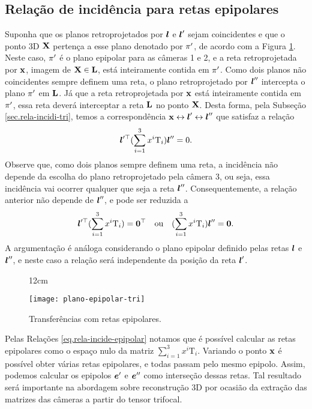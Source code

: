 \subsection{Relação de incidência para retas epipolares}\label{sec.rela-reta-epipolar-tri}
Suponha que os planos retroprojetados por $\boldsymbol{l}$ e $\boldsymbol{l}'$ sejam coincidentes e que o ponto 3D $\mathbf{X}$ pertença a esse plano denotado por $\pi'$, de acordo com a Figura \ref{fig.plano-epipolar-tri}. Neste caso, $\pi'$ é o plano epipolar para as câmeras 1 e 2, e a reta retroprojetada por $\mathbf{x}$, imagem de $\mathbf{X}\in{\bf L}$, está inteiramente contida em $\pi'$. Como dois planos não coincidentes sempre definem uma reta, o plano retroprojetado por $\boldsymbol{l}''$ intercepta o plano $\pi'$ em ${\bf L}$. Já que a reta retroprojetada por $\mathbf{x}$ está inteiramente contida em $\pi'$, essa reta deverá interceptar a reta ${\bf L}$ no ponto $\mathbf{X}$. Desta forma, pela Subseção \ref{sec.rela-incidi-tri}, temos a correspondência $\mathbf{x}\leftrightarrow\boldsymbol{l}'\leftrightarrow\boldsymbol{l}''$ que satisfaz a relação
\begin{equation*}
\boldsymbol{l}'^\top(\sum_{i=1}^3 x^i\mbox{T}_i)\boldsymbol{l}''=0.
\end{equation*}
Observe que, como dois planos sempre definem uma reta, a incidência não depende da escolha do plano retroprojetado pela câmera 3, ou seja, essa incidência vai ocorrer qualquer que seja a reta $\boldsymbol{l}''$. Consequentemente, a relação anterior não depende de $\boldsymbol{l}''$, e pode ser reduzida a 
\begin{equation}\label{eq.rela-incide-epipolar}
\boldsymbol{l}'^\top(\sum_{i=1}^3 x^i\mbox{T}_i)={\bf 0}^\top\quad\text{ou}\quad(\sum_{i=1}^3 x^i\mbox{T}_i)\boldsymbol{l}''={\bf 0}.
\end{equation}
A argumentação é análoga considerando o plano epipolar definido pelas retas $\boldsymbol{l}$ e $\boldsymbol{l}''$, e neste caso a relação será independente da posição da reta $\boldsymbol{l}'$. 
\begin{figure}[!htb]{12cm}
\caption{Transfer\^encias com retas epipolares.}
\texttt{[image: plano-epipolar-tri]}
\label{fig.plano-epipolar-tri}
\end{figure}
Pelas Relações \ref{eq.rela-incide-epipolar} notamos que é possível calcular as retas epipolares como o espaço nulo da matriz $\sum_{i=1}^3 x^i \mbox{T}_i$. Variando o ponto $\mathbf{x}$ é possível obter várias retas epipolares, e todas passam pelo mesmo epipolo. Assim, podemos calcular os epipolos $\boldsymbol{e}'$ e $\boldsymbol{e}''$ como interseção dessas retas. Tal resultado será importante na abordagem sobre reconstrução 3D por ocasião da extração das matrizes das câmeras a partir do tensor trifocal.

